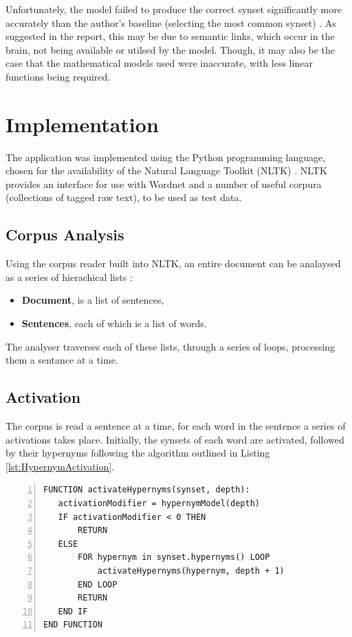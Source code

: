 \documentclass[]{article}
\begin{document}
Unfortunately, the model failed to produce the correct synset significantly more accurately than the author's baseline (selecting the most common synset) \cite{MattBurkePrevious}. As suggested in the report, this may be due to semantic links, which occur in the brain, not being available or utilsed by the model. Though, it may also be the case that the mathematical models used were inaccurate, with less linear functions being required.


\section{Implementation}
\label{sec:Implementation}
The application was implemented using the Python programming language, chosen for the availability of the Natural Language Toolkit (NLTK) \cite{NLTK}. NLTK provides an interface for use with Wordnet and a number of useful corpura (collections of tagged raw text), to be used as test data.

\subsection{Corpus Analysis}
\label{sec:CorpusAnalysis}
Using the corpus reader built into NLTK, an entire document can be analaysed as a series of hierachical lists \cite{NLTK}:

\begin{itemize}
	\item \textbf{Document}, is a list of sentences,
	\item \textbf{Sentences}, each of which is a list of words.
\end{itemize}

The analyser traverses each of these lists, through a series of loops, processing them a sentance at a time.

\subsection{Activation}
\label{sec:activation} 

The corpus is read a sentence at a time, for each word in the sentence a series of activations takes place. Initially, the synsets of each word are activated, followed by their hypernyms following the algorithm outlined in Listing \ref{lst:HypernymActivation}.

\begin{lstlisting}[numbers=left, numberstyle=\small, caption={Hypernym Activation}, captionpos=b, label={lst:HypernymActivation}]
FUNCTION activateHypernyms(synset, depth):
   activationModifier = hypernymModel(depth)
   IF activationModifier < 0 THEN
       RETURN
   ELSE
       FOR hypernym in synset.hypernyms() LOOP
           activateHypernyms(hypernym, depth + 1)
       END LOOP
       RETURN
   END IF
END FUNCTION
\end{lstlisting}
\end{document}
